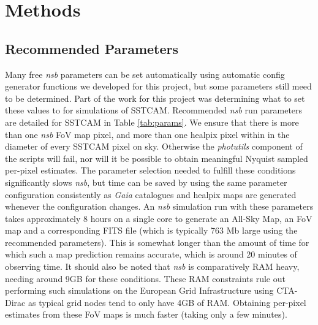 \section{Methods}


\subsection{Recommended Parameters}
\label{sec:examples:params}

Many free \textit{nsb} parameters can be set automatically using automatic config generator functions we developed for this project, but some parameters still meed to be determined. Part of the work for this project was determining what to set these values to for simulations of SSTCAM. Recommended \textit{nsb} run parameters are detailed for SSTCAM in Table \ref{tab:params}. We ensure that there is more than one \textit{nsb} FoV map pixel, and more than one healpix pixel within in the diameter of every SSTCAM pixel on sky. Otherwise the \textit{photutils} component of the scripts will fail, nor will it be possible to obtain meaningful Nyquist sampled per-pixel estimates. The parameter selection needed to fulfill these conditions significantly slows \textit{nsb}, but time can be saved by using the same parameter configuration consistently as \textit{Gaia} catalogues and healpix maps are generated whenever the configuration changes. An \textit{nsb} simulation run with these parameters takes approximately 8 hours on a single core to generate an All-Sky Map, an FoV map and a corresponding FITS file (which is typically 763 Mb large using the recommended parameters). This is somewhat longer than the amount of time for which such a map prediction remains accurate, which is around 20 minutes of observing time. It should also be noted that \textit{nsb} is comparatively RAM heavy, needing around 9GB for these conditions. These RAM constraints rule out performing such simulations on the European Grid Infrastructure using CTA-Dirac as typical grid nodes tend to only have 4GB of RAM. Obtaining per-pixel estimates from these FoV maps is much faster (taking only a few minutes).


